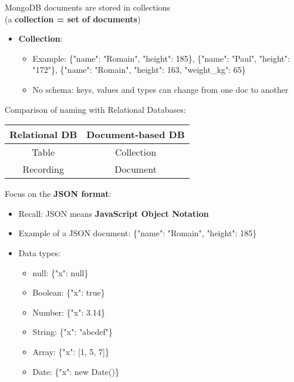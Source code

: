 \documentclass{beamer}[10pt, usepdftitle=false handout]
\begin{document}
	\begin{frame}
	
	MongoDB documents are stored in collections \\ (a \textbf{collection = set of documents})
	\vspace*{0.6em}

	\begin{itemize}
		\item{\textbf{Collection}:
			\begin{itemize}
				\item{Example: \lbrack\{"name": "Romain", "height": 185\}, \{"name": "Paul", "height": "172"\}, \{"name": "Romain", "height": 163, "weight\_kg": 65\}\rbrack}
				\item{No schema: keys, values and types can change from one doc to another}	
			\end{itemize}					
		}
	\end{itemize}
\vspace*{0.6em}

Comparison of naming with Relational Databases:
\vspace*{0.6em}

\begin{center}
	\begin{tabular}{ c | c }
\textbf{Relational DB} & \textbf{Document-based DB} \\ \hline
Table &   Collection \\ \hline
Recording & Document	\\ 
	\end{tabular}
\end{center}


\end{frame}	
\begin{frame}

Focus on the \textbf{JSON format}:
\vspace*{0.6em}

\begin{itemize}
\item{Recall: JSON means \textbf{JavaScript Object Notation}}
\item{Example of a JSON document: \{"name": "Romain", "height": 185\}}
\item{Data types:
	\begin{itemize}
	\item{null: \{"x": null\}}	
	\item{Boolean: \{"x": true\}}
	\item{Number: \{"x": 3.14\}}
	\item{String: \{"x": "abcdef"\}}
	\item{Array: \{"x": [1, 5, 7]\}}
	\item{Date: \{"x": new Date()\}}
	\end{itemize}
}
\end{itemize}

\end{frame}	
	
\end{document}
